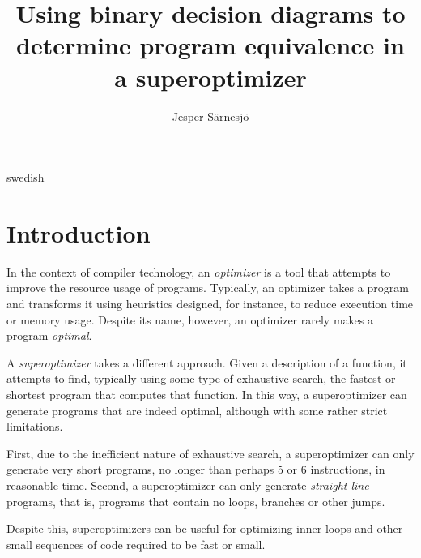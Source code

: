 \documentclass[a4paper,11pt]{kth-mag}
\title{Using binary decision diagrams to determine program equivalence in a superoptimizer}
\subtitle{}
\author{Jesper Särnesjö}
\date{}
\begin{document}
\frontmatter

\pagestyle{empty}

\removepagenumbers

\maketitle


\begin{abstract}
\end{abstract}

\clearpage

\begin{foreignabstract}{swedish}
\end{foreignabstract}

\clearpage

\tableofcontents*

\mainmatter

\pagestyle{newchap}

\chapter{Introduction}
\label{ch:introduction}

In the context of compiler technology, an \emph{optimizer} is a tool that attempts to improve the resource usage of programs.
Typically, an optimizer takes a program and transforms it using heuristics designed, for instance, to reduce execution time or memory usage.
Despite its name, however, an optimizer rarely makes a program \emph{optimal}.

A \emph{superoptimizer} takes a different approach.
Given a description of a function, it attempts to find, typically using some type of exhaustive search, the fastest or shortest program that computes that function.
In this way, a superoptimizer can generate programs that are indeed optimal, although with some rather strict limitations.

First, due to the inefficient nature of exhaustive search, a superoptimizer can only generate very short programs, no longer than perhaps 5 or 6 instructions, in reasonable time.
Second, a superoptimizer can only generate \emph{straight-line} programs, that is, programs that contain no loops, branches or other jumps.

Despite this, superoptimizers can be useful for optimizing inner loops and other small sequences of code required to be fast or small.
\end{document}
